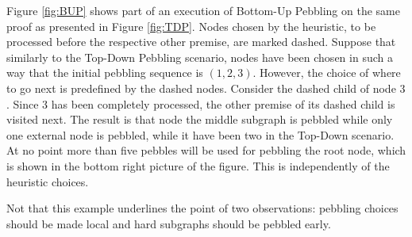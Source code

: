 \begin{example}
Figure \ref{fig:BUP} shows part of an execution of Bottom-Up Pebbling on the same proof as presented in Figure \ref{fig:TDP}.
Nodes chosen by the heuristic, to be processed before the respective other premise, are marked dashed. 
Suppose that similarly to the Top-Down Pebbling scenario, nodes have been chosen in such a way that the initial pebbling sequence is $(1,2,3)$.
However, the choice of where to go next is predefined by the dashed nodes. 
Consider the dashed child of node $3$. 
Since $3$ has been completely processed, the other premise of its dashed child is visited next. 
The result is that node the middle subgraph is pebbled while only one external node is pebbled, while it have been two in the Top-Down scenario. 
At no point more than five pebbles will be used for pebbling the root node, which is shown in the bottom right picture of the figure. This is independently of the heuristic choices.

Not that this example underlines the point of two observations: pebbling choices should be made local and hard subgraphs should be pebbled early.


\end{example}
